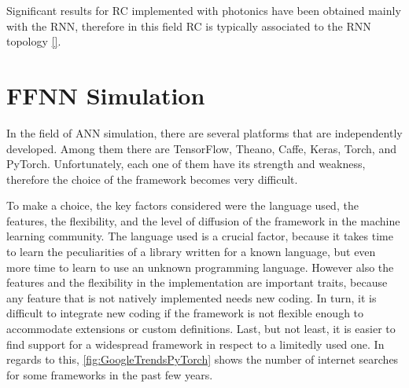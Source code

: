 Significant results for \acs{RC} implemented with photonics have been obtained mainly with the \acs{RNN}, therefore in this field \acs{RC} is typically associated to the \acs{RNN} topology \ref{}.


%


\section{FFNN Simulation}
\label{sec:FFNN_Simulation}
In the field of \acs{ANN} simulation, there are several platforms that are independently developed.
Among them there are TensorFlow, Theano, Caffe, Keras, Torch, and PyTorch.
Unfortunately, each one of them have its strength and weakness, therefore the choice of the framework becomes very difficult.

To make a choice, the key factors considered were the language used, the features, the flexibility, and the level of diffusion of the framework in the machine learning community.
The language used is a crucial factor, because it takes time to learn the peculiarities of a library written for a known language, but even more time to learn to use an unknown programming language.
However also the features and the flexibility in the implementation are important traits, because any feature that is not natively implemented needs new coding.
In turn, it is difficult to integrate new coding if the framework is not flexible enough to accommodate extensions or custom definitions.
Last, but not least, it is easier to find support for a widespread framework in respect to a limitedly used one.
In regards to this, \autoref{fig:GoogleTrendsPyTorch} shows the number of internet searches for some frameworks in the past few years.


